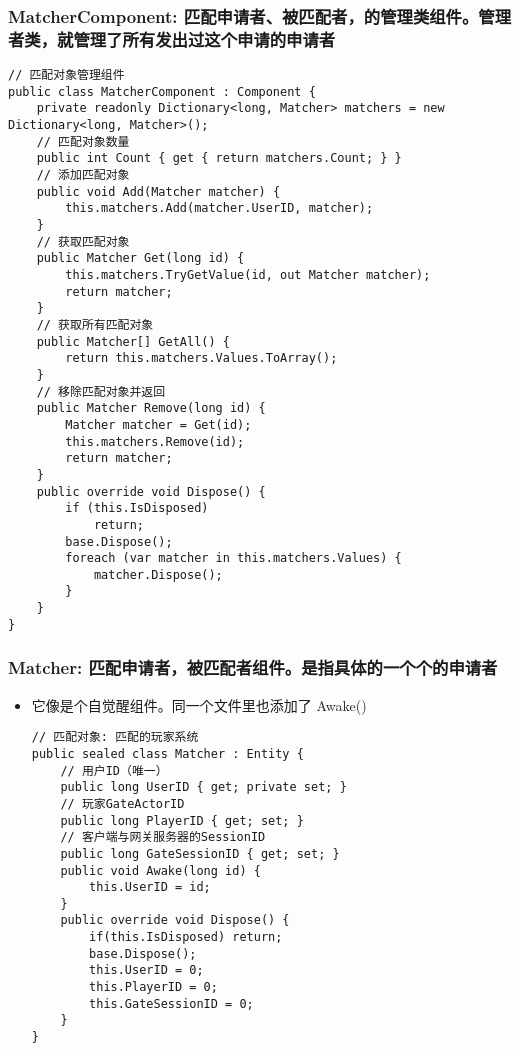 \documentclass[9pt, b5paper]{article}
\begin{document}
\subsubsection{MatcherComponent: 匹配申请者、被匹配者，的管理类组件。管理者类，就管理了所有发出过这个申请的申请者}
\label{sec-1-4-3}
\begin{verbatim}
// 匹配对象管理组件
public class MatcherComponent : Component {
    private readonly Dictionary<long, Matcher> matchers = new Dictionary<long, Matcher>();
    // 匹配对象数量
    public int Count { get { return matchers.Count; } }
    // 添加匹配对象
    public void Add(Matcher matcher) {
        this.matchers.Add(matcher.UserID, matcher);
    }
    // 获取匹配对象
    public Matcher Get(long id) {
        this.matchers.TryGetValue(id, out Matcher matcher);
        return matcher;
    }
    // 获取所有匹配对象
    public Matcher[] GetAll() {
        return this.matchers.Values.ToArray();
    }
    // 移除匹配对象并返回
    public Matcher Remove(long id) {
        Matcher matcher = Get(id);
        this.matchers.Remove(id);
        return matcher;
    }
    public override void Dispose() {
        if (this.IsDisposed) 
            return;
        base.Dispose();
        foreach (var matcher in this.matchers.Values) {
            matcher.Dispose();
        }
    }
}
\end{verbatim}
\subsubsection{Matcher: 匹配申请者，被匹配者组件。是指具体的一个个的申请者}
\label{sec-1-4-4}
\begin{itemize}
\item 它像是个自觉醒组件。同一个文件里也添加了 Awake()
\begin{verbatim}
// 匹配对象: 匹配的玩家系统
public sealed class Matcher : Entity {
    // 用户ID（唯一）
    public long UserID { get; private set; }
    // 玩家GateActorID
    public long PlayerID { get; set; }
    // 客户端与网关服务器的SessionID
    public long GateSessionID { get; set; }
    public void Awake(long id) {
        this.UserID = id;
    }
    public override void Dispose() {
        if(this.IsDisposed) return; 
        base.Dispose();
        this.UserID = 0;
        this.PlayerID = 0;
        this.GateSessionID = 0;
    }
}
\end{verbatim}
\end{itemize}
\end{document}
